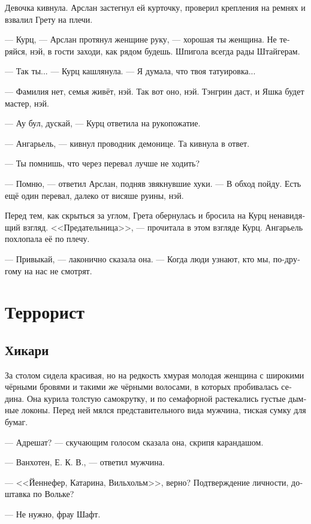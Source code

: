 \documentclass[a4paper,12pt,fleqn]{book}\usepackage{polyglossia}\setdefaultlanguage[babelshorthands=true]{russian}\setotherlanguage{english}\defaultfontfeatures{Ligatures=TeX,Mapping=tex-text}\usepackage{xcolor}\newcommand{\ml}[3]{#2}
\begin{document}
Девочка кивнула.
Арслан застегнул ей курточку, проверил крепления на ремнях и взвалил Грету на плечи.

--- Курц, --- Арслан протянул женщине руку, --- хорошая ты женщина.
Не теряйся, нэй, в гости заходи, как рядом будешь.
Шпигола всегда рады Штайгерам.

--- Так ты... --- Курц кашлянула.
--- Я думала, что твоя татуировка...

--- Фамилия нет, семья живёт, нэй.
Так вот оно, нэй.
Тэнгрин даст, и Яшка будет мастер, нэй.

\ml{$0$}
{--- Ау бул, дускай, --- Курц ответила на рукопожатие.}
{``\textit{Au bul, duþk\ae{},}'' Kurz answered the handshake.}

--- Ангарьель, --- кивнул проводник демонице.
Та кивнула в ответ.

--- Ты помнишь, что через перевал лучше не ходить?

--- Помню, --- ответил Арслан, подняв звякнувшие хуки.
--- В обход пойду.
Есть ещё один перевал, далеко от висяше руины, нэй.

Перед тем, как скрыться за углом, Грета обернулась и бросила на Курц ненавидящий взгляд.
<<Предательница>>, --- прочитала в этом взгляде Курц.
Ангарьель похлопала её по плечу.

--- Привыкай, --- лаконично сказала она.
--- Когда люди узнают, кто мы, по-другому на нас не смотрят.

\chapter{Террорист}

\section{Хикари}

За столом сидела красивая, но на редкость хмурая молодая женщина с широкими чёрными бровями и такими же чёрными волосами, в которых пробивалась седина.
Она курила толстую самокрутку, и по семафорной растекались густые дымные локоны.
Перед ней мялся представительного вида мужчина, тиская сумку для бумаг.

--- Адрешат? --- скучающим голосом сказала она, скрипя карандашом.

--- Ванхотен, Е. К. В., --- ответил мужчина.

--- <<Йеннефер, Катарина, Вильхольм>>, верно?
Подтверждение личности, доштавка по Вольке?

--- Не нужно, фрау Шафт.
\end{document}
